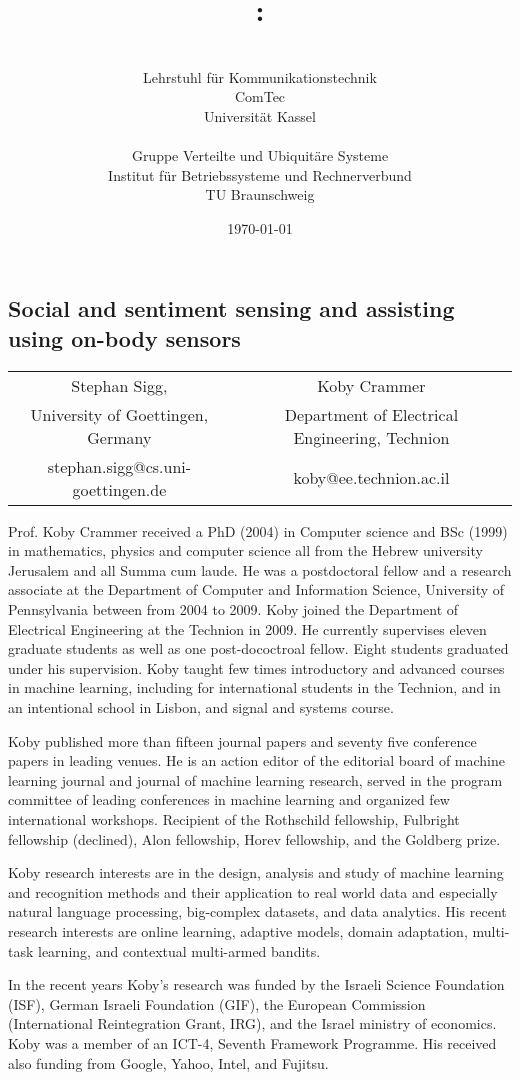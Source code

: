 \documentclass[12pt]{article}
\author{\begin{minipage}[t]{7.1cm}\centering \small \VornameAntragstellerA\ \NachnameAntragstellerA\\ \small Lehrstuhl für Kommunikationstechnik\\ \small ComTec\\ \small Universität Kassel\end{minipage}
\begin{minipage}[t]{7.1cm}\centering \small \VornameAntragstellerB\ \NachnameAntragstellerB\\ \small Gruppe Verteilte und Ubiquitäre Systeme \\ \small Institut für Betriebssysteme und Rechnerverbund\\ \small TU Braunschweig\end{minipage}}
\title{\projektname:\\\notiz{Social and sentiment sensing and assisting using on-body sensors}}
\date{\small \today}
\begin{document}
\onehalfspacing %
\setcounter{secnumdepth}{5}
\pagebreak
\begin{center}
\section*{Social and sentiment sensing and assisting using on-body sensors}
\begin{tabular}{cc}
  Stephan Sigg, & Koby Crammer\\
  University of Goettingen, Germany & Department of Electrical Engineering, Technion \\
 stephan.sigg@cs.uni-goettingen.de & koby@ee.technion.ac.il
\end{tabular}

\end{center}

\vspace{1cm}

Prof. Koby Crammer received a PhD (2004) in Computer science and BSc (1999) in mathematics, physics and computer science all from the Hebrew university Jerusalem and all Summa cum laude.
He was a postdoctoral fellow and a research associate at the Department of Computer and Information Science, University of Pennsylvania between from 2004 to 2009. 
Koby joined the Department of Electrical Engineering at the Technion in 2009.  
He currently supervises eleven graduate students as well as one post-dococtroal fellow. Eight students graduated under his supervision.
Koby taught few times introductory and advanced courses in machine learning, including for international students in the Technion, and in an intentional school in Lisbon, and signal and systems course. 


Koby published more than fifteen journal papers and seventy five conference papers in leading venues. 
He is an action editor of the editorial board of machine learning journal and journal of machine learning research, served in the program committee of leading conferences in machine learning and organized few international workshops. Recipient of the Rothschild fellowship, Fulbright fellowship (declined), Alon fellowship, Horev fellowship, and the Goldberg prize. 

Koby research interests are in the design, analysis and study of machine learning and recognition methods and their application to real world data and especially natural language processing, big-complex datasets, and data analytics. His recent research interests are online learning, adaptive models, domain adaptation, multi-task learning, and contextual multi-armed bandits.

In the recent years Koby's research was funded by the Israeli Science Foundation (ISF), German Israeli Foundation (GIF), the European Commission (International Reintegration Grant, IRG), and the Israel ministry of economics. Koby was a member of an ICT-4, Seventh Framework Programme. His received also funding from Google, Yahoo, Intel, and Fujitsu.
\label{maxSeitenzahl}
\end{document}
